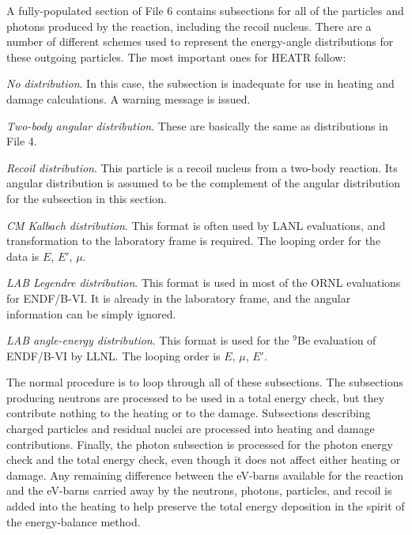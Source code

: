 A fully-populated section of File 6 contains subsections for all of
the particles and photons produced by the reaction, including
the recoil nucleus.  There are a number of different schemes
used to represent the energy-angle distributions for these
outgoing particles.  The most important ones for HEATR follow:
\begin{itemize}
\begin{singlespace}
\item {\it No distribution}.  In this case, the subsection is
      inadequate for use in heating and damage calculations.
      A warning message is issued.

\item {\it Two-body angular distribution}.  These are basically
      the same as distributions in File 4.

\item {\it Recoil distribution}.  This particle is a recoil
      nucleus from a two-body reaction.  Its angular
      distribution is assumed to be the complement of the
      angular distribution for the  subsection
      in this section.

\item {\it CM Kalbach distribution}.  This format is often used
      by LANL evaluations, and transformation to the
      laboratory frame is required.  The looping order for
      the data is $E$, $E'$, $\mu$.

\item{\it LAB Legendre distribution}.  This format is used in
      most of the ORNL evaluations for ENDF/B-VI.  It is
      already in the laboratory frame, and the angular
      information can be simply ignored.

\item{\it LAB angle-energy distribution}.  This format is
      used for the $^{9}$Be evaluation of ENDF/B-VI by LLNL.
      The looping order is $E$, $\mu$, $E'$.
\end{singlespace}
\end{itemize}

\noindent
The normal procedure is to loop through all of these subsections.
The subsections producing neutrons are processed to be used in
a total energy check, but they contribute nothing to the heating
or to the damage. Subsections describing charged particles and
residual nuclei are processed into heating and damage contributions.
Finally, the photon subsection is processed for the photon energy
check and the total energy check, even though it does not affect
either heating or damage.  Any remaining difference between the
eV-barns available for the reaction and the eV-barns carried
away by the neutrons, photons, particles, and recoil is added
into the heating to help preserve the total energy deposition
in the spirit of the energy-balance method.

